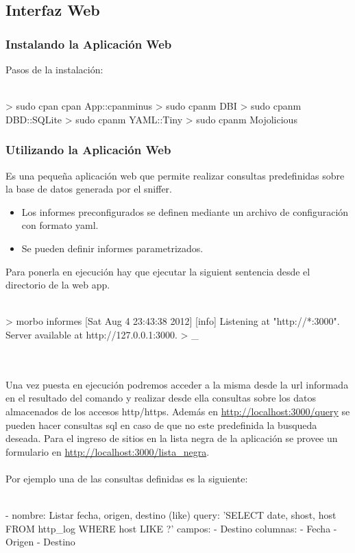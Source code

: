 \subsection{Interfaz Web}

\subsubsection{Instalando la Aplicación Web}

Pasos de la instalación:
\\\\
{\small
\begin{boxedverbatim}
	> sudo cpan cpan App::cpanminus
	> sudo cpanm DBI
	> sudo cpanm DBD::SQLite
	> sudo cpanm YAML::Tiny
	> sudo cpanm Mojolicious
\end{boxedverbatim}
}

\subsubsection{Utilizando la Aplicación Web}

Es una pequeña aplicación web que permite realizar consultas predefinidas sobre la base de datos generada por el sniffer. 
\begin{itemize}
	\item Los informes preconfigurados se definen mediante un archivo de configuración con formato yaml.
	\item Se pueden definir informes parametrizados.
\end{itemize}

Para ponerla en ejecución hay que ejecutar la siguient sentencia desde el directorio de la web app.
\\\\
{\small
\begin{boxedverbatim}
	> morbo informes
	[Sat Aug  4 23:43:38 2012] [info] Listening at "http://*:3000".
	Server available at http://127.0.0.1:3000.
	> _
\end{boxedverbatim}
}
\\\\
Una vez puesta en ejecución podremos acceder a la misma desde la url informada 
en el resultado del comando y realizar desde ella consultas sobre los datos 
almacenados de los accesos http/https. Además en \url{http://localhost:3000/query} se pueden hacer consultas sql en caso de que no este predefinida la busqueda deseada.
Para el ingreso de sitios en la lista negra de la aplicación se provee un formulario en \url{http://localhost:3000/lista\_negra}.
\\
\\Por ejemplo una de las consultas definidas es la siguiente: 
\\\\
	{\small
	\begin{boxedverbatim}
	- nombre: Listar fecha, origen, destino (like)
  query: 'SELECT date, shost, host FROM http_log WHERE host LIKE ?'
  campos: 
   - Destino
  columnas:
   - Fecha
   - Origen
   - Destino
	\end{boxedverbatim}
	}
